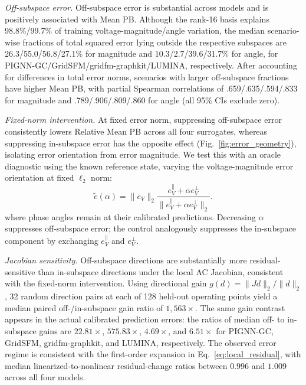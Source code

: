 \documentclass{article}
\begin{document}
\noindent\textit{Off-subspace error.}
Off-subspace error is substantial across models and is positively associated
with Mean PB. Although the rank-16 basis explains 98.8\%/99.7\% of training
voltage-magnitude/angle variation, the median scenario-wise fractions of total squared
error lying outside the respective subspaces are
26.3/55.0/56.8/27.1\% for magnitude and
10.3/2.7/39.6/31.7\% for angle, for
PIGNN-GC/GridSFM/gridfm-graphkit/LUMINA, respectively.
After accounting for differences in total error norms, scenarios with larger
off-subspace fractions have higher Mean PB, with partial Spearman correlations
of .659/.635/.594/.833 for magnitude and
.789/.906/.809/.860 for angle (all 95\% CIs exclude zero).
\vspace{0.35em}

\noindent\textit{Fixed-norm intervention.}
At fixed error norm, suppressing off-subspace error consistently lowers
Relative Mean PB across all four surrogates, whereas suppressing in-subspace
error has the opposite effect (Fig.~\ref{fig:error_geometry}), isolating
error orientation from error magnitude. We test this with an oracle
diagnostic using the known reference state, varying the voltage-magnitude
error orientation at fixed $\ell_2$ norm:
\begin{equation}
\tilde e(\alpha)
=
\|e_V\|_2
\frac{e_V^\parallel+\alpha e_V^\perp}
{\|e_V^\parallel+\alpha e_V^\perp\|_2}.
\label{eq:controlled_geometry}
\end{equation}
where phase angles remain at their calibrated predictions. Decreasing $\alpha$ suppresses off-subspace error; the control analogously
suppresses the in-subspace component by exchanging
$e_V^\parallel$ and $e_V^\perp$.
\vspace{0.35em}

\noindent\textit{Jacobian sensitivity.}
Off-subspace directions are substantially more residual-sensitive than
in-subspace directions under the local AC Jacobian, consistent with the
fixed-norm intervention. Using directional gain
$g(d)=\|Jd\|_2/\|d\|_2$, 32 random direction pairs at each of 128 held-out
operating points yield a median paired off-/in-subspace gain ratio of
$1{,}563\times$. The same gain contrast appears in the actual calibrated
prediction errors: the ratios of median off- to in-subspace gains are
$22.81\times$, $575.83\times$, $4.69\times$, and $6.51\times$ for
PIGNN-GC, GridSFM, gridfm-graphkit, and LUMINA, respectively.
The observed error regime is consistent with the first-order expansion in
Eq.~\eqref{eq:local_residual}, with median linearized-to-nonlinear
residual-change ratios between $0.996$ and $1.009$ across all four models.
\end{document}
